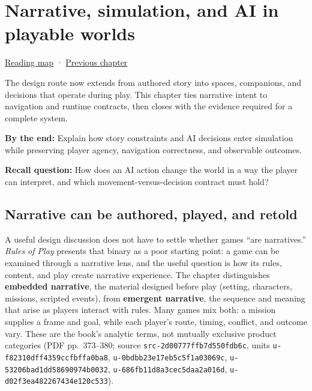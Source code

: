 \chapter{Narrative, simulation, and AI in playable worlds}\label{06-engine-ii-ch047-narrative-simulation-and-ai-in-playable-worlds}\hypertarget{06-engine-ii-ch047}{}\label{stagechapter:06-engine-ii-ch047}

\hyperref[volume-reading-map]{Reading map} · \hyperref[06-engine-ii-ch046-game-design-from-mechanics-to-narrative-interfaces]{Previous chapter}

The design route now extends from authored story into spaces, companions, and decisions that operate during play. This chapter ties narrative intent to navigation and runtime contracts, then closes with the evidence required for a complete system.

\textbf{By the end:} Explain how story constraints and AI decisions enter simulation while preserving player agency, navigation correctness, and observable outcomes.

\textbf{Recall question:} How does an AI action change the world in a way the player can interpret, and which movement-versus-decision contract must hold?

\section{Narrative can be authored, played, and retold}\label{06-engine-ii-ch047-narrative-can-be-authored-played-and-retold}

A useful design discussion does not have to settle whether games ``are narratives.'' \emph{Rules of Play} presents that binary as a poor starting point: a game can be examined through a narrative lens, and the useful question is how its rules, content, and play create narrative experience. The chapter distinguishes \textbf{embedded narrative}, the material designed before play (setting, characters, missions, scripted events), from \textbf{emergent narrative}, the sequence and meaning that arise as players interact with rules. Many games mix both: a mission supplies a frame and goal, while each player's route, timing, conflict, and outcome vary. These are the book's analytic terms, not mutually exclusive product categories (PDF pp.~373--380; source \texttt{src-2d00777ffb7d550fdb6c}, units \texttt{u-f82310dff4359ccfbffa0ba8}, \texttt{u-0bdbb23e17eb5c5f1a03069c}, \texttt{u-53206bad1dd58690974b0032}, \texttt{u-686fb11d8a3cec5daa2a016d}, \texttt{u-d02f3ea482267434e120c533}).

